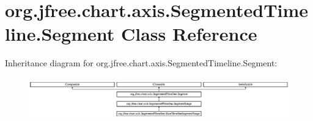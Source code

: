 \hypertarget{classorg_1_1jfree_1_1chart_1_1axis_1_1_segmented_timeline_1_1_segment}{}\section{org.\+jfree.\+chart.\+axis.\+Segmented\+Timeline.\+Segment Class Reference}
\label{classorg_1_1jfree_1_1chart_1_1axis_1_1_segmented_timeline_1_1_segment}
Inheritance diagram for org.\+jfree.\+chart.\+axis.\+Segmented\+Timeline.\+Segment\+:\begin{figure}[H]
\begin{center}
\leavevmode
\includegraphics[height=1.857380cm]{classorg_1_1jfree_1_1chart_1_1axis_1_1_segmented_timeline_1_1_segment}
\end{center}
\end{figure}
